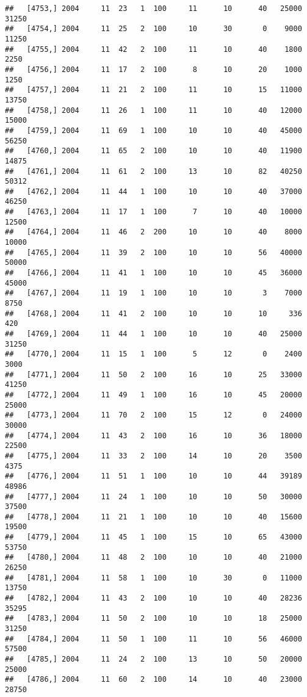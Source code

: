 \documentclass{article}\usepackage[]{graphicx}\usepackage[]{color}
\makeatletter
\newenvironment{kframe}{%
 \def\at@end@of@kframe{}%
 \ifinner\ifhmode%
  \def\at@end@of@kframe{\end{minipage}}%
  \begin{minipage}{\columnwidth}%
 \fi\fi%
 \def\FrameCommand##1{\hskip\@totalleftmargin \hskip-\fboxsep
 \colorbox{shadecolor}{##1}\hskip-\fboxsep
     \hskip-\linewidth \hskip-\@totalleftmargin \hskip\columnwidth}%
 \MakeFramed {\advance\hsize-\width
   \@totalleftmargin\z@ \linewidth\hsize
   \@setminipage}}%
 {\par\unskip\endMakeFramed%
 \at@end@of@kframe}
\newenvironment{knitrout}{}{} %
\makeatother
\begin{document}
\begin{knitrout}
\begin{kframe}
\begin{verbatim}
##   [4753,] 2004     11  23   1  100     11      10      40   25000   31250
##   [4754,] 2004     11  25   2  100     10      30       0    9000   11250
##   [4755,] 2004     11  42   2  100     11      10      40    1800    2250
##   [4756,] 2004     11  17   2  100      8      10      20    1000    1250
##   [4757,] 2004     11  21   2  100     11      10      15   11000   13750
##   [4758,] 2004     11  26   1  100     11      10      40   12000   15000
##   [4759,] 2004     11  69   1  100     10      10      40   45000   56250
##   [4760,] 2004     11  65   2  100     10      10      40   11900   14875
##   [4761,] 2004     11  61   2  100     13      10      82   40250   50312
##   [4762,] 2004     11  44   1  100     10      10      40   37000   46250
##   [4763,] 2004     11  17   1  100      7      10      40   10000   12500
##   [4764,] 2004     11  46   2  200     10      10      40    8000   10000
##   [4765,] 2004     11  39   2  100     10      10      56   40000   50000
##   [4766,] 2004     11  41   1  100     10      10      45   36000   45000
##   [4767,] 2004     11  19   1  100     10      10       3    7000    8750
##   [4768,] 2004     11  41   2  100     10      10      10     336     420
##   [4769,] 2004     11  44   1  100     10      10      40   25000   31250
##   [4770,] 2004     11  15   1  100      5      12       0    2400    3000
##   [4771,] 2004     11  50   2  100     16      10      25   33000   41250
##   [4772,] 2004     11  49   1  100     16      10      45   20000   25000
##   [4773,] 2004     11  70   2  100     15      12       0   24000   30000
##   [4774,] 2004     11  43   2  100     16      10      36   18000   22500
##   [4775,] 2004     11  33   2  100     14      10      20    3500    4375
##   [4776,] 2004     11  51   1  100     10      10      44   39189   48986
##   [4777,] 2004     11  24   1  100     10      10      50   30000   37500
##   [4778,] 2004     11  21   1  100     10      10      40   15600   19500
##   [4779,] 2004     11  45   1  100     15      10      65   43000   53750
##   [4780,] 2004     11  48   2  100     10      10      40   21000   26250
##   [4781,] 2004     11  58   1  100     10      30       0   11000   13750
##   [4782,] 2004     11  43   2  100     10      10      40   28236   35295
##   [4783,] 2004     11  50   2  100     10      10      18   25000   31250
##   [4784,] 2004     11  50   1  100     11      10      56   46000   57500
##   [4785,] 2004     11  24   2  100     13      10      50   20000   25000
##   [4786,] 2004     11  60   2  100     14      10      40   23000   28750

\end{verbatim}
\end{kframe}
\end{knitrout}
\end{document}
